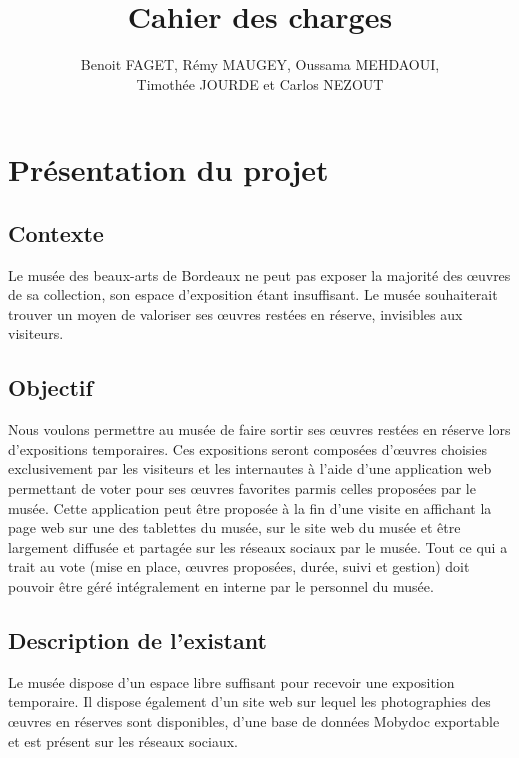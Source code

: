 \documentclass[a4paper]{article}
\title{Cahier des charges}
\author{Benoit FAGET, Rémy MAUGEY, Oussama MEHDAOUI,\\Timothée JOURDE et Carlos NEZOUT}
\begin{document}
\maketitle
\newpage

\tableofcontents
\newpage


\section{Présentation du projet}
\subsection{Contexte}
Le musée des beaux-arts de Bordeaux ne peut pas exposer la majorité des œuvres de sa collection, son espace d’exposition étant insuffisant. Le musée souhaiterait trouver un moyen de valoriser ses œuvres restées en réserve, invisibles aux visiteurs.
\subsection{Objectif}
Nous voulons permettre au musée de faire sortir ses œuvres restées en réserve lors d’expositions temporaires. Ces expositions seront composées d’œuvres choisies exclusivement par les visiteurs et les internautes à l’aide d’une application web permettant de voter pour ses œuvres favorites parmis celles proposées par le musée. Cette application peut être proposée à la fin d’une visite en affichant la page web sur une des tablettes du musée, sur le site web du musée et être largement diffusée et partagée sur les réseaux sociaux par le musée. Tout ce qui a trait au vote (mise en place, œuvres proposées, durée, suivi et gestion) doit pouvoir être géré intégralement en interne par le personnel du musée.
\subsection{Description de l'existant}
Le musée dispose d’un espace libre suffisant pour recevoir une exposition temporaire. Il dispose également d’un site web sur lequel les photographies des œuvres en réserves sont disponibles, d'une base de données Mobydoc exportable et est présent sur les réseaux sociaux.
\end{document}
